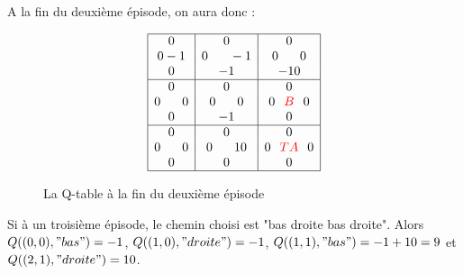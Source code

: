 A la fin du deuxième épisode, on aura donc : 
\begin{figure}[!ht]
\centering
$$\begin{array}{|c|c|c|}
\hline
0                      & 0                           & 0 \\
0 -1 & 0 \hspace*{0.6cm} -1 & 0\hspace*{0.6cm}0 \\
0          & -1          & -10 \\
\hline
0          & 0                            & 0 \\
0\hspace*{0.6cm}0   & 0\hspace*{0.6cm} 0                  & 0\hspace*{0.25cm}\textcolor{red}{B}\hspace*{0.25cm} 0 \\
0           & -1          & 0 \\
\hline
0          & 0                         & 0\\
0\hspace*{0.6cm} 0                     & 0\hspace*{0.6cm}10                & 0\hspace*{0.25cm}\textcolor{red}{T A}\hspace*{0.25cm} 0 \\
0                            & 0        & 0 \\
\hline
\end{array}
$$
\caption{La Q-table à la fin du deuxième épisode}
\end{figure}

Si à un troisième épisode, le chemin choisi est "bas droite bas droite". 
Alors $Q((0,0), "bas")=-1$, $Q((1,0), "droite")=-1$, $Q((1,1), "bas")=-1+10=9$ et $Q((2,1), "droite")=10$.

